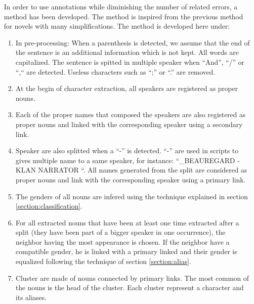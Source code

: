 \documentclass[a4paper, 12pt]{report}
\begin{document}
In order to use annotations while diminishing the number of related errors, a method has been developed. The method is inspired from the previous method for novels with many simplifications. The method is developed here under:
\begin{enumerate}
\item In pre-processing: When a parenthesis is detected, we assume that the end of the sentence is an additional information which is not kept. All words are capitalized. The sentence is spitted in multiple speaker when ``And'', ``/''  or ``,`` are detected.   Useless characters such as ``;'' or ``.'' are removed.
\item At the begin of character extraction, all speakers are registered as proper nouns.
\item Each of the proper names that composed the speakers are also registered as proper nouns and linked with the corresponding speaker using a secondary link.
\item Speaker are also splitted when a ``-'' is detected. ``-'' are used in scripts to gives multiple name to a same speaker, for instance: ``_BEAUREGARD - KLAN NARRATOR ``. All names generated from the split are considered as proper nouns and link with the corresponding speaker using a primary link.
\item The genders of all nouns are infered using the technique explained in section \ref{section:classification}.
\item For all extracted nouns that have been at least one time extracted after a split (they have been part of a bigger speaker in one occurrence), the  neighbor having the most appearance is chosen. If the neighbor have a compatible gender, he is linked with a primary linked and their gender is equalized following the technique of section \ref{section:alias}.
\item Cluster are made of nouns connected by primary links. The most common of the nouns is the head of the cluster. Each cluster represent a character and its aliases.
\end{enumerate}
\end{document}
